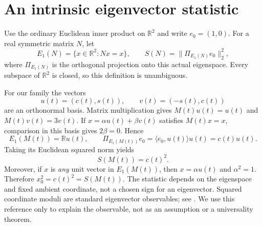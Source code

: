 \documentclass[10pt]{article}
\newcommand{\R}{\mathbb R}
\begin{document}
\clearpage
\section{An intrinsic eigenvector statistic}
Use the ordinary Euclidean inner product on $\R^2$ and write $e_0=(1,0)$. For a real symmetric matrix $N$, let
\[
 E_1(N)=\{x\in\R^2:Nx=x\},\qquad
 S(N)=\|\Pi_{E_1(N)}e_0\|_2^2,
\]
where $\Pi_{E_1(N)}$ is the orthogonal projection onto this actual eigenspace. Every subspace of $\R^2$ is closed, so this definition is unambiguous.

For our family the vectors
\[
 u(t)=(c(t),s(t)),\qquad v(t)=(-s(t),c(t))
\]
are an orthonormal basis. Matrix multiplication gives $M(t)u(t)=u(t)$ and $M(t)v(t)=3v(t)$. If $x=\alpha u(t)+\beta v(t)$ satisfies $M(t)x=x$, comparison in this basis gives $2\beta=0$. Hence
\[
 E_1(M(t))=\R u(t),\qquad
 \Pi_{E_1(M(t))}e_0=\langle e_0,u(t)\rangle u(t)=c(t)u(t).
\]
Taking its Euclidean squared norm yields
\begin{equation}\label{eq:statistic}
 S(M(t))=c(t)^2.
\end{equation}
Moreover, if $x$ is \emph{any} unit vector in $E_1(M(t))$, then $x=\alpha u(t)$ and $\alpha^2=1$. Therefore $x_0^2=c(t)^2=S(M(t))$. The statistic depends on the eigenspace and fixed ambient coordinate, not a chosen sign for an eigenvector. Squared coordinate moduli are standard eigenvector observables; see \cite[Remark 1.8]{ky}. We use this reference only to explain the observable, not as an assumption or a universality theorem.
\end{document}
